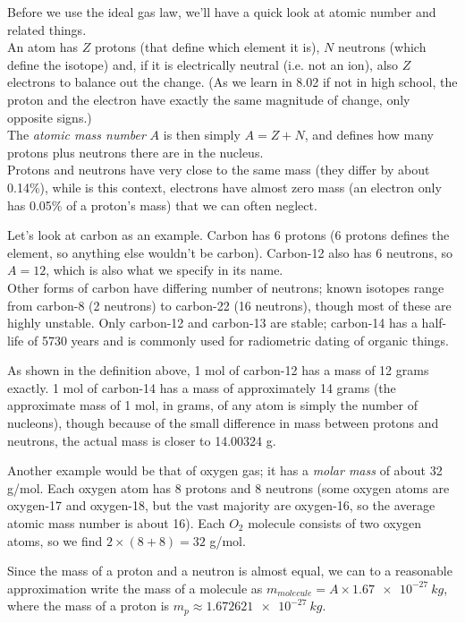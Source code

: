 Before we use the ideal gas law, we'll have a quick look at atomic number and related things.\\
An atom has $Z$ protons (that define which element it is), $N$ neutrons (which define the isotope) and, if it is electrically neutral (i.e. not an ion), also $Z$ electrons to balance out the change. (As we learn in 8.02 if not in high school, the proton and the electron have exactly the same magnitude of change, only opposite signs.)\\
The \emph{atomic mass number} $A$ is then simply $A = Z + N$, and defines how many protons plus neutrons there are in the nucleus.\\
Protons and neutrons have very close to the same mass (they differ by about 0.14\%), while is this context, electrons have almost zero mass (an electron only has 0.05\% of a proton's mass) that we can often neglect.

Let's look at carbon as an example. Carbon has 6 protons (6 protons defines the element, so anything else wouldn't be carbon). Carbon-12 also has 6 neutrons, so $A = 12$, which is also what we specify in its name.\\
Other forms of carbon have differing number of neutrons; known isotopes range from carbon-8 (2 neutrons) to carbon-22 (16 neutrons), though most of these are highly unstable. Only carbon-12 and carbon-13 are stable; carbon-14 has a half-life of 5730 years and is commonly used for radiometric dating of organic things.

As shown in the definition above, 1 mol of carbon-12 has a mass of 12 grams exactly. 1 mol of carbon-14 has a mass of approximately 14 grams (the approximate mass of 1 mol, in grams, of any atom is simply the number of nucleons), though because of the small difference in mass between protons and neutrons, the actual mass is closer to 14.00324 g.

Another example would be that of oxygen gas; it has a \emph{molar mass} of about 32 g/mol. Each oxygen atom has 8 protons and 8 neutrons (some oxygen atoms are oxygen-17 and oxygen-18, but the vast majority are oxygen-16, so the average atomic mass number is about 16). Each $O_2$ molecule consists of two oxygen atoms, so we find $2 \times (8 + 8) = 32$ g/mol.

Since the mass of a proton and a neutron is almost equal, we can to a reasonable approximation write the mass of a molecule as $m_{molecule} = A \times \SI{1.67e-27}{kg}$, where the mass of a proton is $m_p \approx \SI{1.672621e-27}{kg}$.

